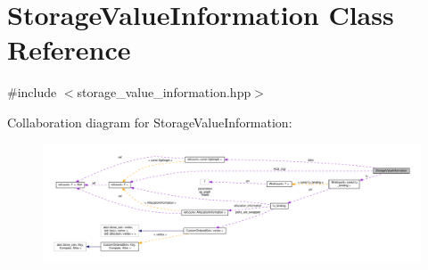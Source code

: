 \hypertarget{classStorageValueInformation}{}\section{Storage\+Value\+Information Class Reference}
\label{classStorageValueInformation}


{\ttfamily \#include $<$storage\+\_\+value\+\_\+information.\+hpp$>$}



Collaboration diagram for Storage\+Value\+Information\+:
\nopagebreak
\begin{figure}[H]
\begin{center}
\leavevmode
\includegraphics[width=350pt]{d6/dc4/classStorageValueInformation__coll__graph}
\end{center}
\end{figure}
